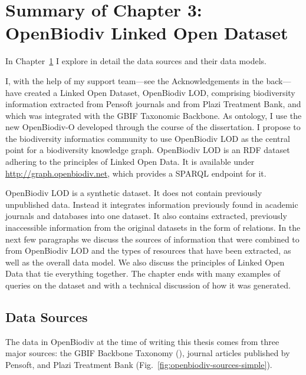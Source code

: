 \chapter{Summary of Chapter 3: OpenBiodiv Linked Open Dataset}
\label{chapter-lod}

In Chapter~\ref{chapter-lod} I explore in detail the data sources and their data models.

I, with the help of my support team---see the Acknowledgements in the back---have created a Linked Open Dataset, OpenBiodiv LOD, comprising biodiversity information extracted from Pensoft journals and from Plazi Treatment Bank, and which was integrated with the GBIF Taxonomic Backbone. As ontology, I use the new \mbox{OpenBiodiv-O} developed through the course of the dissertation. I propose to the biodiversity informatics community to use OpenBiodiv LOD as the central point for a biodiversity knowledge graph. OpenBiodiv LOD is an RDF dataset adhering to the principles of Linked Open Data. It is available under \url{http://graph.openbiodiv.net}, which provides a SPARQL endpoint for it.

OpenBiodiv LOD is a synthetic dataset. It does not contain previously unpublished data. Instead it integrates information previously found in academic journals and databases into one dataset. It also contains  extracted, previously inaccessible information from the original datasets in the form of relations. In the next few paragraphs we discuss the sources of information that were combined to from OpenBiodiv LOD and the types of resources that have been extracted, as well as the overall data model. We also discuss the principles of Linked Open Data that tie everything together. The chapter ends with many examples of queries on the dataset and with a technical discussion of how it was generated.

\section{Data Sources}

The data in OpenBiodiv at the time of writing this thesis comes from three major sources: the GBIF Backbone Taxonomy (\cite{gbif_secretariat_gbif_2017-1}), journal articles published by Pensoft, and Plazi Treatment Bank (Fig.~\ref{fig:openbiodiv-sources-simple}).

